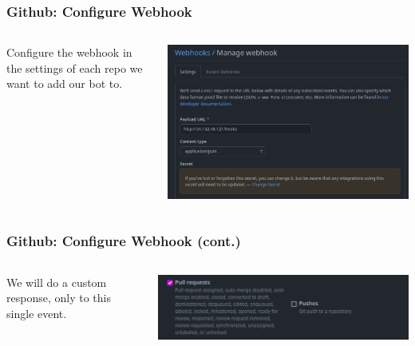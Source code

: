 \documentclass[aspectratio=169]{beamer}
\begin{document}
\begin{frame}
	\frametitle{Github: Configure Webhook}
	\begin{columns}
		\begin{column}{0.5\textwidth}
			Configure the webhook in the settings of each repo we want to add our bot to.
		\end{column}
		\begin{column}{0.5\textwidth}
			\begin{center}
				\includegraphics[width=1.0\textwidth]{../images/webhook1.png}
			\end{center}
		\end{column}
	\end{columns}
\end{frame}

\begin{frame}
	\frametitle{Github: Configure Webhook (cont.)}
	\begin{columns}
		\begin{column}{0.5\textwidth}
			We will do a custom response, only to this single event.
		\end{column}
		\begin{column}{0.5\textwidth}
			\begin{center}
				\includegraphics[width=1.0\textwidth]{../images/webhook2.png}
			\end{center}
		\end{column}
	\end{columns}
\end{frame}
\end{document}

